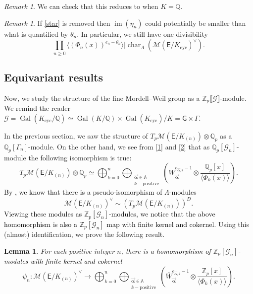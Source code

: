 \documentclass{amsart}
\newcommand{\edit}[1]{\textcolor{black}{#1}}
\newtheorem{lemma}[theorem]{Lemma}
\numberwithin{equation}{section}
\theoremstyle{remark}
\newtheorem{remark}[theorem]{Remark}
\newcommand{\val}{\vec{\boldsymbol{\alpha}}}
\newcommand{\EC}{\mathsf{E}}
\newcommand{\cG}{\mathcal{G}}
\newcommand{\cM}{\mathcal{M}}
\newcommand{\Gal}{\operatorname{Gal}}
\newcommand{\Qp}{\mathbb{Q}_p}
\newcommand{\sG}{\mathsf{G}}
\newcommand{\Zp}{\mathbb{Z}_p}
\newcommand{\A}{\mathbb{A}}
\newcommand{\Q}{\mathbb{Q}}
\newcommand{\cyc}{\operatorname{{cyc}}}
\newcommand{\image}{\operatorname{im}}
\newcommand{\charac}{\operatorname{char}}
\theoremstyle{plain} %
\begin{document}
\begin{remark}
We can check that this reduces to \cite[Theorem~C and Corollary~4.3]{Lei23} when $K=\Q$.
\end{remark}

\begin{remark}
\label{rem: one div}
If \ref{star} is removed then $\image(\eta_n)$ could potentially be smaller than what is quantified by $\theta_n$.
In particular, we still have one divisibility
\[
 \prod_{n\geq 0} \langle (\Phi_n(x))^{e_n -\theta_n} \rangle \Big\vert \charac_{\Lambda}(\cM(\EC/K_{\cyc})^\vee) .
\]
\end{remark}
\subsection{Equivariant results}
Now, we study the structure of the fine Mordell--Weil group as a $\Zp\llbracket \cG \rrbracket$-module.
We remind the reader $\cG = \Gal(K_{\cyc}/\Q) \simeq \Gal(K/\Q) \times \Gal(K_{\cyc})/K = \sG \times \Gamma$.

In the previous section, we saw the structure of $T_p\cM(\EC/K_{(n)}) \otimes \Qp$ as a $\Qp[\Gamma_n]$-module.
On the other hand, we see from \eqref{1} and \eqref{2} that as $\Qp[\cG_n]$-module the following isomorphism is true:
\begin{equation}
\label{TpM tensor Qp equation}
T_p\cM(\EC/K_{(n)}) \otimes \Qp \simeq \bigoplus_{k=0}^n \bigoplus_{\substack{\val\in \A\\ k-\text{positive}}} \left( W_{\val}^{e_{\val,k}-1} \otimes \frac{\Qp[x]}{\langle \Phi_k(x)\rangle} \right).
\end{equation}
\edit{By \cite[Remark~2.4(b)]{Lei23}, we know that there is a pseudo-isomorphism of $\Lambda$-modules}
\[
\cM(\EC/K_{(n)})^\vee \sim \left( T_p \cM(\EC/K_{(n)})\right)^D.
\]
\edit{Viewing these modules as $\Zp[\cG_n]$-modules, we notice that the above homomorphism is also a $\Zp[\cG_n]$ map with finite kernel and cokernel.}
Using this (almost) identification, we prove the following result.

\begin{lemma}
For each positive integer $n$, there is a \edit{homomorphism of} $\Zp[\cG_n]$-module\edit{s with finite kernel and cokernel} 
\[
\psi_n : \cM(\EC/K_{(n)})^\vee \longrightarrow \bigoplus_{k=0}^n \bigoplus_{\substack{\val\in \A\\ k-\text{positive}}} \left( \overline{W}_{\val}^{e_{\val,k}-1} \otimes \frac{\Zp[x]}{\langle \Phi_k(x)\rangle} \right).
\]
\end{lemma}
\end{document}
